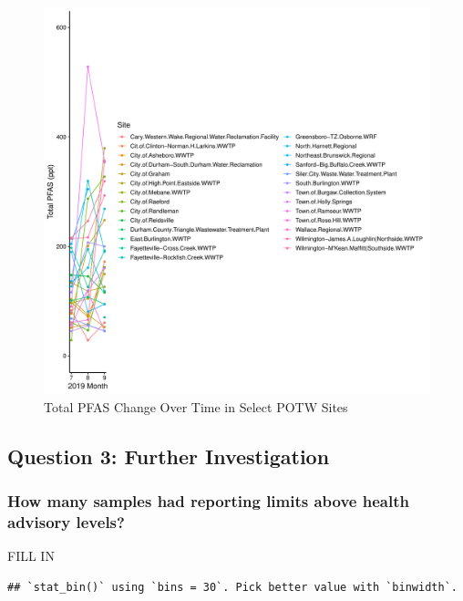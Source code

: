 \documentclass[
  12pt,
]{article}
\begin{document}
\begin{figure}

\includegraphics{PFAS_FinalProject_files/figure-latex/unnamed-chunk-26-1} \hfill{}

\caption{Total PFAS Change Over Time in Select POTW Sites}\label{fig:unnamed-chunk-26}
\end{figure}

\hypertarget{question-3-further-investigation}{%
\subsection{Question 3: Further
Investigation}\label{question-3-further-investigation}}

\hypertarget{how-many-samples-had-reporting-limits-above-health-advisory-levels}{%
\subsubsection{How many samples had reporting limits above health
advisory
levels?}\label{how-many-samples-had-reporting-limits-above-health-advisory-levels}}

FILL IN

\begin{verbatim}
## `stat_bin()` using `bins = 30`. Pick better value with `binwidth`.
\end{verbatim}
\end{document}
